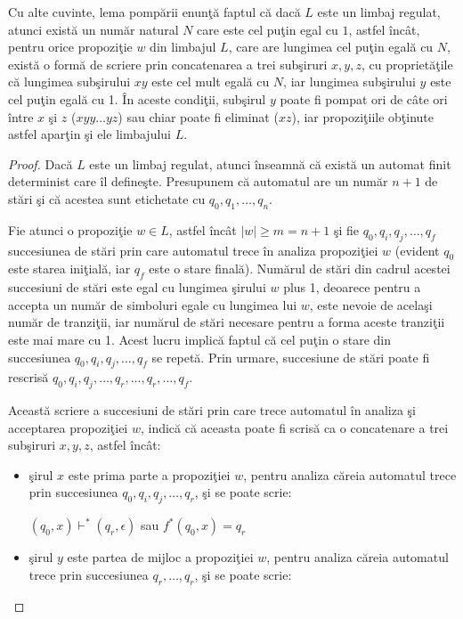 Cu alte cuvinte, lema pompării enunţă faptul că dacă $ L $ este un limbaj regulat, atunci există un număr natural $ N $ care este cel puţin egal cu $ 1 $, astfel încât, pentru orice propoziţie $ w $ din limbajul $ L $, care are lungimea cel puţin egală cu $ N $, există o formă de scriere prin concatenarea a trei subşiruri $ x, y, z $, cu proprietăţile că lungimea subşirului $ xy $ este cel mult egală cu $ N $, iar lungimea subşirului $ y $ este cel puţin egală cu 1. În aceste condiţii, subşirul $ y $ poate fi pompat ori de câte ori între $ x $ şi $ z $ ($ xyy \dots yz $) sau chiar poate fi eliminat ($ xz $), iar propoziţiile obţinute astfel aparţin şi ele limbajului $ L $.

\begin{proof}
Dacă $ L $ este un limbaj regulat, atunci înseamnă că există un automat finit determinist care îl defineşte. Presupunem că automatul are un număr $ n + 1 $ de stări şi că acestea sunt etichetate cu $ q_0, q_1, \dots, q_n $. 

Fie atunci o propoziţie $ w \in L $, astfel încât $ |w| \geq m = n +1 $ şi fie $ q_0, q_i, q_j, \dots, q_f $ succesiunea de stări prin care automatul trece în analiza propoziţiei $ w $ (evident $ q_0 $ este starea iniţială, iar $ q_f $ este o stare finală). Numărul de stări din cadrul acestei succesiuni de stări este egal cu lungimea şirului $ w $ plus 1, deoarece pentru a accepta un număr de simboluri egale cu lungimea lui $ w $, este nevoie de acelaşi număr de tranziţii, iar numărul de stări necesare pentru a forma aceste tranziţii este mai mare cu 1. Acest lucru implică faptul că cel puţin o stare din succesiunea $ q_0, q_i, q_j, \dots, q_f $ se repetă. Prin urmare, succesiune de stări poate fi rescrisă $ q_0, q_i, q_j, \dots, q_r, \dots, q_r, \dots, q_f $. 

Această scriere a succesiuni de stări prin care trece automatul în analiza şi acceptarea propoziţiei $ w $, indică că aceasta poate fi scrisă ca o concatenare a trei subşiruri $ x, y, z $, astfel încât:

\begin{itemize}
\item
şirul $ x $ este prima parte a propoziţiei $ w $, pentru analiza căreia automatul trece prin succesiunea $ q_0, q_i, q_j, \dots, q_r$, şi se poate scrie:

$ (q_0,x) \vdash^* (q_r, \epsilon)  $ sau $ f^*(q_0, x) = q_r $
\item
şirul $ y $ este partea de mijloc a propoziţiei $ w $, pentru analiza căreia automatul trece prin succesiunea $ q_r, \dots, q_r$,  şi se poate scrie:


\end{itemize}
\end{proof}
